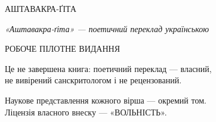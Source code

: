 \documentclass[10pt,a5paper,openany]{book}
\begin{document}
\begin{titlepage}
  \centering
  \vspace*{18mm}
  {\sffamily\Large АШТАВАКРА-ҐІТА}\par
  \vspace{6mm}
  {\itshape «Аштавакра-ґіта» — поетичний переклад українською}\par
  \vspace{16mm}
  {\sffamily\small РОБОЧЕ ПІЛОТНЕ ВИДАННЯ}\par
  \vspace{4mm}
  {\footnotesize
   Це не завершена книга: поетичний переклад — власний,\\
   не вивірений санскритологом і не рецензований.\par}
  \vfill
  {\footnotesize
   Наукове представлення кожного вірша — окремий том.\\
   Ліцензія власного внеску — «ВОЛЬНІСТЬ».\par}
  \vspace*{10mm}
\end{titlepage}


\end{document}

